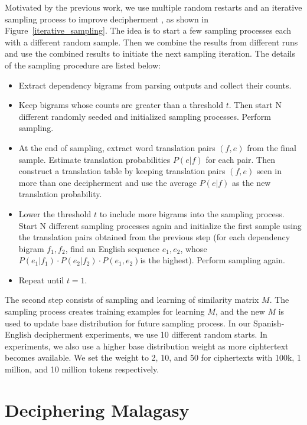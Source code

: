 Motivated by the previous work, we use multiple random restarts and an iterative sampling process to improve decipherment \cite{Dou:2012}, as shown in Figure~\ref{iterative_sampling}. The idea is to start a few sampling processes each with a different random sample. Then we combine the results from different runs and use the combined results to initiate the next sampling iteration. The details of the sampling procedure are listed below:

 \begin{itemize}
  \item Extract dependency bigrams from parsing outputs and collect their counts.
  \item Keep bigrams whose counts are greater than a threshold $t$. Then start N different randomly seeded and initialized sampling processes. Perform sampling.
  \item At the end of sampling, extract word translation pairs $(f,e)$ from the final sample. Estimate translation probabilities $P(e|f)$  for each pair. Then construct a translation table by keeping translation pairs $(f,e)$ seen in more than one decipherment and use the average $P(e|f)$ as the new translation probability.
  \item Lower the threshold $t$ to include more bigrams into the sampling process. Start N different sampling processes again and initialize the first sample using the translation pairs obtained from the previous step (for each dependency bigram $f_{1},f_{2}$, find an English sequence $e_{1},e_{2}$, whose $P(e_{1}|f_{1})\cdot P(e_{2}|f_{2})\cdot P(e_{1},e_{2})$is the highest). Perform sampling again.
  \item Repeat until $t=1$.
\end{itemize}

The second step consists of sampling and learning of similarity matrix $M$. The sampling process  creates training examples for learning $M$, and the new $M$ is used to update base distribution for future sampling process. In our Spanish-English decipherment experiments, we use 10 different random starts. In experiments, we also use a higher base distribution weight as more ciphtertext becomes available. We set the weight to 2, 10, and 50 for ciphertexts with 100k, 1 million, and 10 million tokens respectively. 

\section{Deciphering Malagasy}
\label{decipher_malagasy}


